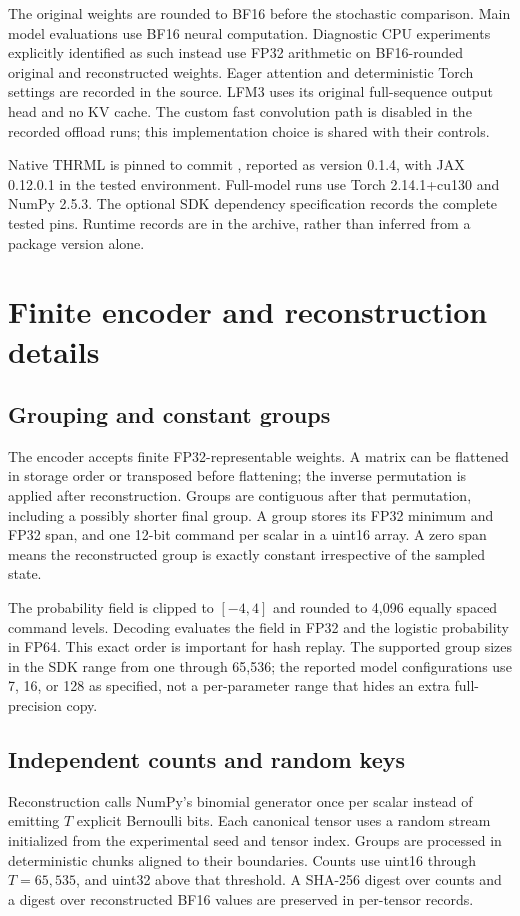 \documentclass[11pt]{article}
\begin{document}
The original weights are rounded to BF16 before the stochastic comparison. Main model evaluations use BF16 neural computation. Diagnostic CPU experiments explicitly identified as such instead use FP32 arithmetic on BF16-rounded original and reconstructed weights. Eager attention and deterministic Torch settings are recorded in the source. LFM3 uses its original full-sequence output head and no KV cache. The custom fast convolution path is disabled in the recorded offload runs; this implementation choice is shared with their controls.

Native THRML is pinned to commit , reported as version 0.1.4, with JAX 0.12.0.1 in the tested environment. Full-model runs use Torch 2.14.1+cu130 and NumPy 2.5.3. The optional SDK dependency specification records the complete tested pins. Runtime records are in the archive, rather than inferred from a package version alone.

\section{Finite encoder and reconstruction details}
\subsection{Grouping and constant groups}
The encoder accepts finite FP32-representable weights. A matrix can be flattened in storage order or transposed before flattening; the inverse permutation is applied after reconstruction. Groups are contiguous after that permutation, including a possibly shorter final group. A group stores its FP32 minimum and FP32 span, and one 12-bit command per scalar in a uint16 array. A zero span means the reconstructed group is exactly constant irrespective of the sampled state.

The probability field is clipped to $[-4,4]$ and rounded to 4,096 equally spaced command levels. Decoding evaluates the field in FP32 and the logistic probability in FP64. This exact order is important for hash replay. The supported group sizes in the SDK range from one through 65,536; the reported model configurations use 7, 16, or 128 as specified, not a per-parameter range that hides an extra full-precision copy.

\subsection{Independent counts and random keys}
Reconstruction calls NumPy's binomial generator once per scalar instead of emitting $T$ explicit Bernoulli bits. Each canonical tensor uses a random stream initialized from the experimental seed and tensor index. Groups are processed in deterministic chunks aligned to their boundaries. Counts use uint16 through $T=65{,}535$, and uint32 above that threshold. A SHA-256 digest over counts and a digest over reconstructed BF16 values are preserved in per-tensor records.
\end{document}

